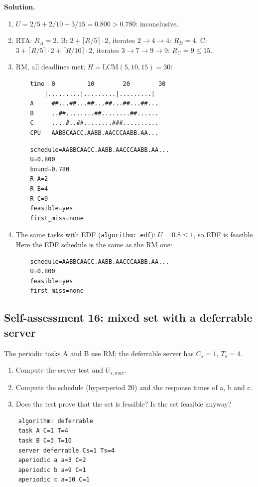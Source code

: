 \textbf{Solution.}
\begin{enumerate}
    \item $U = 2/5 + 2/10 + 3/15 = 0.800 > 0.780$: inconclusive.
    \item RTA: $R_A = 2$. B: $2 + \lceil R/5 \rceil \cdot 2$, iterates $2 \to 4 \to 4$: $R_B = 4$. C: $3 + \lceil R/5 \rceil \cdot 2 + \lceil R/10 \rceil \cdot 2$, iterates $3 \to 7 \to 9 \to 9$: $R_C = 9 \le 15$.
    \item RM, all deadlines met; $H = \mathrm{LCM}(5, 10, 15) = 30$:
\begin{verbatim}
    time  0         10        20        30
        |.........|.........|.........|
    A     ##...##...##...##...##...##...
    B     ..##........##........##......
    C     ....#..##........###..........
    CPU   AABBCAACC.AABB.AACCCAABB.AA...
\end{verbatim}

\begin{verbatim}
    schedule=AABBCAACC.AABB.AACCCAABB.AA...
    U=0.800
    bound=0.780
    R_A=2
    R_B=4
    R_C=9
    feasible=yes
    first_miss=none
\end{verbatim}
    \item The same tasks with EDF (\texttt{algorithm: edf}): $U = 0.8 \le 1$, so EDF is feasible. Here the EDF schedule is the same as the RM one:
\begin{verbatim}
    schedule=AABBCAACC.AABB.AACCCAABB.AA...
    U=0.800
    feasible=yes
    first_miss=none
\end{verbatim}
\end{enumerate}

\subsection*{Self-assessment 16: mixed set with a deferrable server}
The periodic tasks A and B use RM; the deferrable server has $C_s = 1$, $T_s = 4$.
\begin{enumerate}
    \item Compute the server test and $U_{s,max}$.
    \item Compute the schedule (hyperperiod 20) and the response times of a, b and c.
    \item Does the test prove that the set is feasible? Is the set feasible anyway?
\end{enumerate}
\begin{lstlisting}
    algorithm: deferrable
    task A C=1 T=4
    task B C=3 T=10
    server deferrable Cs=1 Ts=4
    aperiodic a a=3 C=2
    aperiodic b a=9 C=1
    aperiodic c a=10 C=1
\end{lstlisting}

